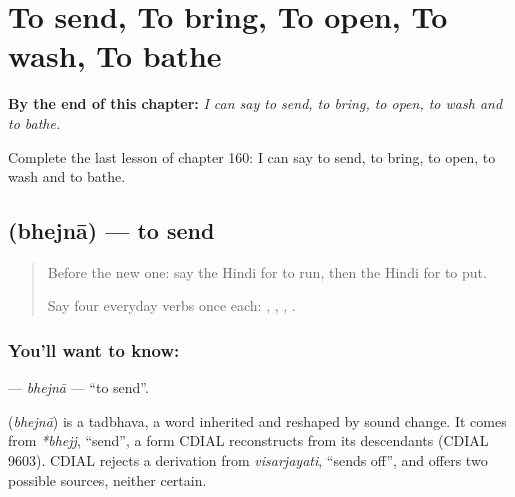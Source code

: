 
\chapter{To send, To bring, To open, To wash, To bathe}
\label{ch:hi-to-send-to-bring-to-open-to-wash-to-bathe}

\begin{chapteropening}
\textbf{By the end of this chapter:} \emph{I can say to send, to bring, to open, to wash and to bathe.}

Complete the last lesson of chapter 160: I can say to send, to bring, to open, to wash and to bathe.
\end{chapteropening}

\section[\texorpdfstring{\hi{भेजना} (bhejnā)}{भेजना (bhejnā)}]{ (bhejnā) — to send}

\label{lesson:HI-C160-bhejna}



\begin{quote}
Before the new one: say the Hindi for to run, then the Hindi for to put.

Say four everyday verbs once each: \textbf{}, \textbf{}, \textbf{}, \textbf{ }.
\end{quote}

\subsection*{You'll want to know: }
\textbf{} — \emph{bhejnā} — \textquotedblleft{}to send\textquotedblright{}.

\begin{cousinweb}
\textbf{} (\emph{bhejnā}) is a tadbhava, a word inherited and reshaped by sound change. It comes from \emph{*bhejj}, \textquotedblleft{}send\textquotedblright{}, a form CDIAL reconstructs from its descendants (CDIAL 9603). CDIAL rejects a derivation from \emph{visarjayati}, \textquotedblleft{}sends off\textquotedblright{}, and offers two possible sources, neither certain.
\end{cousinweb}

